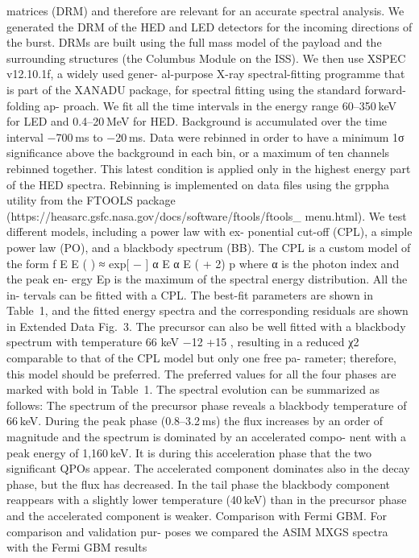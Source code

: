 matrices (DRM) and therefore are relevant for an accurate spectral
analysis. We generated the DRM of the HED and LED detectors for the
incoming directions of the burst. DRMs are built using the full mass
model of the payload and the surrounding structures (the Columbus
Module on the ISS). We then use XSPEC v12.10.1f, a widely used gener-
al-purpose X-ray spectral-fitting programme that is part of the XANADU
package, for spectral fitting using the standard forward-folding ap-
proach. We fit all the time intervals in the energy range 60–350 keV for
LED and 0.4–20 MeV for HED. Background is accumulated over the
time interval −700 ms to −20 ms. Data were rebinned in order to have
a minimum 1σ significance above the background in each bin, or a
maximum of ten channels rebinned together. This latest condition is
applied only in the highest energy part of the HED spectra. Rebinning
is implemented on data files using the grppha utility from the FTOOLS
package (https://heasarc.gsfc.nasa.gov/docs/software/ftools/ftools\_
menu.html). We test different models, including a power law with ex-
ponential cut-off (CPL), a simple power law (PO), and a blackbody
spectrum (BB). The CPL is a custom model of the form
f E
E
( ) ≈
exp[ −
]
α
E α
E
( + 2)
p
 where α is the photon index and the peak en-
ergy Ep is the maximum of the spectral energy distribution. All the in-
tervals can be fitted with a CPL. The best-fit parameters are shown in
Table 1, and the fitted energy spectra and the corresponding residuals
are shown in Extended Data Fig. 3. The precursor can also be well fitted
with a blackbody spectrum with temperature 66
keV
−12
+15
, resulting in a
reduced χ2 comparable to that of the CPL model but only one free pa-
rameter; therefore, this model should be preferred. The preferred
values for all the four phases are marked with bold in Table 1.
The spectral evolution can be summarized as follows: The spectrum
of the precursor phase reveals a blackbody temperature of 66 keV.
During the peak phase (0.8–3.2 ms) the flux increases by an order of
magnitude and the spectrum is dominated by an accelerated compo-
nent with a peak energy of 1,160 keV. It is during this acceleration phase
that the two significant QPOs appear. The accelerated component
dominates also in the decay phase, but the flux has decreased. In the
tail phase the blackbody component reappears with a slightly lower
temperature (40 keV) than in the precursor phase and the accelerated
component is weaker.
Comparison with Fermi GBM. For comparison and validation pur-
poses we compared the ASIM MXGS spectra with the Fermi GBM results
